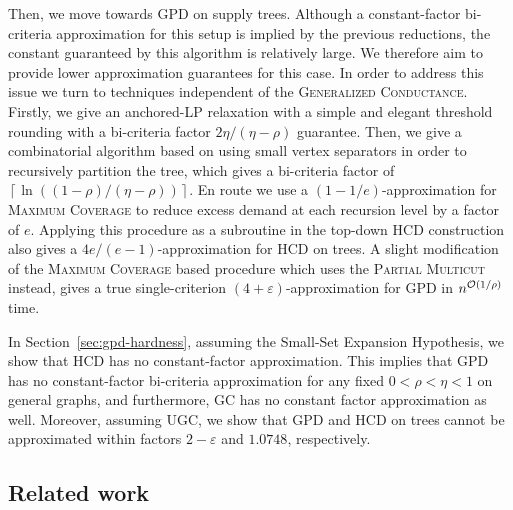 Then, we move towards GPD on supply trees. Although a constant-factor bi-criteria approximation for this setup is implied by the previous reductions, the constant guaranteed by this algorithm is relatively large. We therefore aim to provide lower approximation guarantees for this case.
In order to address this issue we turn to techniques independent of the \textsc{Generalized Conductance}. Firstly, we give an
anchored-LP relaxation with a simple and elegant threshold rounding with a bi-criteria factor $2\eta/(\eta-\rho)$ guarantee. Then, we give a combinatorial algorithm based on using small vertex separators in order to recursively partition the tree, which gives a bi-criteria factor of $\left\lceil\ln\left((1-\rho)/(\eta-\rho)\right)\right\rceil$. En route we use a $(1-1/e)$-approximation for \textsc{Maximum Coverage} to reduce excess demand at each recursion level by a factor of $e$. Applying this procedure as a subroutine in the top-down HCD construction also gives a $4e/(e-1)$-approximation for HCD on trees. A slight modification of the \textsc{Maximum Coverage} based procedure which uses the \textsc{Partial Multicut} instead, gives a true single-criterion $(4+\varepsilon)$-approximation for GPD in $n^{\mathcal{O}(1/\rho)}$ time.

In Section~\ref{sec:gpd-hardness}, assuming the Small-Set Expansion Hypothesis, we show that HCD has no constant-factor approximation. This implies that GPD has no constant-factor bi-criteria approximation for any fixed $0<\rho<\eta<1$ on general graphs, and furthermore, GC has no constant factor approximation as well. Moreover, assuming UGC, we show that GPD and HCD on trees cannot be approximated within factors $2-\varepsilon$ and $1.0748$, respectively.


\subsection{Related work}

